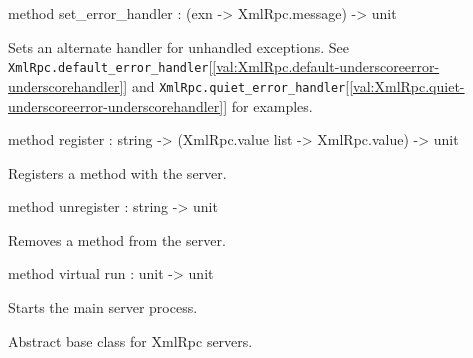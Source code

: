 \documentclass[11pt]{article}
\begin{document}
\begin{ocamldocobjectend}
\begin{ocamldocdescription}
\end{ocamldocdescription}


\label{method:XmlRpcServer.base.set-underscoreerror-underscorehandler}\begin{ocamldoccode}
method set_error_handler : (exn -> XmlRpc.message) -> unit
\end{ocamldoccode}
\begin{ocamldocdescription}
Sets an alternate handler for unhandled exceptions.
      See {\tt{XmlRpc.default\_error\_handler}}[\ref{val:XmlRpc.default-underscoreerror-underscorehandler}] and
      {\tt{XmlRpc.quiet\_error\_handler}}[\ref{val:XmlRpc.quiet-underscoreerror-underscorehandler}] for examples.


\end{ocamldocdescription}


\label{method:XmlRpcServer.base.register}\begin{ocamldoccode}
method register : string -> (XmlRpc.value list -> XmlRpc.value) -> unit
\end{ocamldoccode}
\begin{ocamldocdescription}
Registers a method with the server.


\end{ocamldocdescription}


\label{method:XmlRpcServer.base.unregister}\begin{ocamldoccode}
method unregister : string -> unit
\end{ocamldoccode}
\begin{ocamldocdescription}
Removes a method from the server.


\end{ocamldocdescription}


\label{method:XmlRpcServer.base.run}\begin{ocamldoccode}
method virtual run : unit -> unit
\end{ocamldoccode}
\begin{ocamldocdescription}
Starts the main server process.


\end{ocamldocdescription}
\end{ocamldocobjectend}


\begin{ocamldocdescription}
Abstract base class for XmlRpc servers.


\end{ocamldocdescription}
\end{document}
